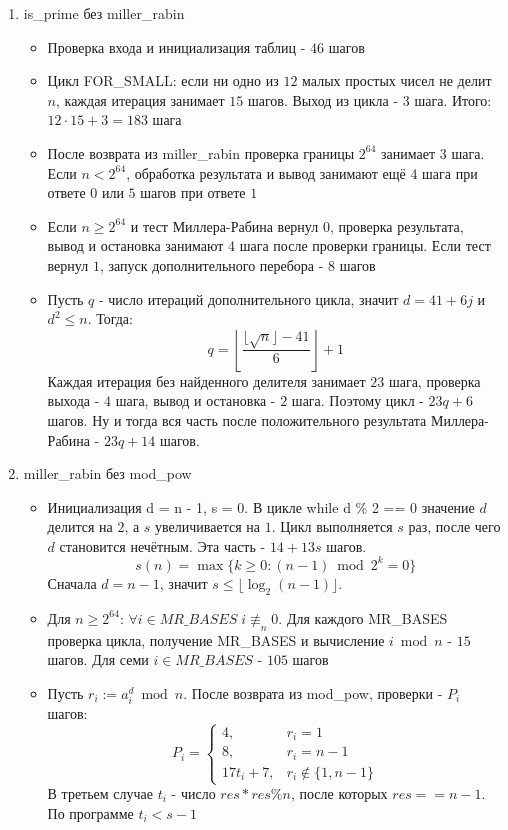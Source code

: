 \documentclass[12pt]{article}
\begin{document}
\begin{enumerate}
    \item is\_prime без miller\_rabin
    \begin{itemize}
        \item Проверка входа и инициализация таблиц - $46$ шагов
        \item Цикл FOR\_SMALL: если ни одно из $12$ малых простых чисел не делит $n$, каждая итерация занимает $15$ шагов. Выход из цикла - $3$ шага. Итого: $12\cdot15+3=183$ шага
        \item После возврата из miller\_rabin проверка границы $2^{64}$ занимает $3$ шага. Если $n<2^{64}$, обработка результата и вывод занимают ещё $4$ шага при ответе $0$ или $5$ шагов при ответе $1$
        \item Если $n\geq2^{64}$ и тест Миллера-Рабина вернул $0$, проверка результата, вывод и остановка занимают $4$ шага после проверки границы. Если тест вернул $1$, запуск дополнительного перебора - $8$ шагов
        \item Пусть $q$ - число итераций дополнительного цикла, значит $d=41+6j$ и $d^2\leq n$. Тогда:
        \[
            q=\left\lfloor\frac{\lfloor\sqrt n\rfloor-41}{6}\right\rfloor+1
        \]
        Каждая итерация без найденного делителя занимает $23$ шага, проверка выхода - $4$ шага, вывод и остановка - $2$ шага. Поэтому цикл - $23q+6$ шагов. Ну и тогда вся часть после положительного результата Миллера-Рабина - $23q+14$ шагов.
    \end{itemize}

    \item miller\_rabin без mod\_pow
    \begin{itemize}
        \item Инициализация d = n - 1, s = 0.
        В цикле while d \% 2 == 0 значение $d$ делится на $2$,
        а $s$ увеличивается на $1$. Цикл выполняется $s$ раз, после
        чего $d$ становится нечётным. Эта часть - $14+13s$ шагов.
        \[
            s(n)=\max\{k\geq0:(n-1)\bmod 2^k=0\}
        \]
        Сначала $d = n - 1$, значит $s\le \lfloor\log_2(n-1)\rfloor$.

        \item Для $n\geq2^{64}$: $\forall i\in MR\_BASES \; i\not\equiv_n0$.
        Для каждого MR\_BASES проверка цикла, получение MR\_BASES и
        вычисление $i \bmod n$ - $15$ шагов. Для семи $i\in MR\_BASES$ -
        $105$ шагов

        \item Пусть $r_i:=a_i^d\bmod n$. После возврата из
        mod\_pow, проверки - $P_i$ шагов:
        \[
            P_i=\begin{cases}
                4, & r_i=1\\
                8, & r_i=n-1\\
                17t_i+7, & r_i\notin\{1,n-1\}
            \end{cases}
        \]
        В третьем случае $t_i$ - число $res * res \% n$,
        после которых $res == n-1$. По программе $t_i<s-1$


\end{itemize}
\end{enumerate}
\end{document}
